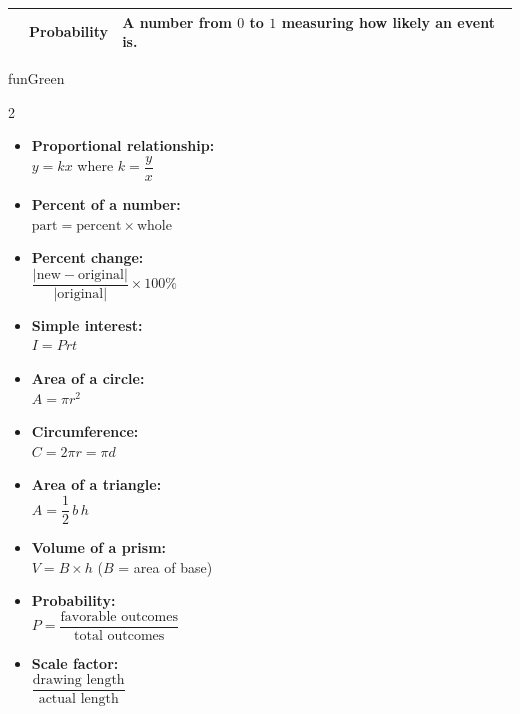 {\begin{center}
\begin{tabular}{
    >{\centering\arraybackslash}m{2cm}
    >{\raggedright\arraybackslash}m{3cm}
    >{\raggedright\arraybackslash}m{8.5cm}
}
{\fontsize{18}{20}\selectfont\textcolor{funPink}{$P(\text{event})$}} &
Probability &
A number from $0$ to $1$ measuring how likely an event is. \\

\bottomrule
\end{tabular}
\end{center}

\vspace{3mm}

\begin{wbDashBox}{funGreen}
    {\color{funGreen}\faCalculator}\;
    \par\vspace{3pt}
    \small
    \begin{multicols}{2}
    \begin{itemize}[leftmargin=*, itemsep=3pt]
        \item \textbf{Proportional relationship:}\\
            $y = kx$ \quad where $k = \dfrac{y}{x}$
        \item \textbf{Percent of a number:}\\
            $\text{part} = \text{percent} \times \text{whole}$
        \item \textbf{Percent change:}\\
            $\dfrac{|\text{new} - \text{original}|}{|\text{original}|} \times 100\%$
        \item \textbf{Simple interest:}\\
            $I = Prt$
        \item \textbf{Area of a circle:}\\
            $A = \pi r^{2}$
        \item \textbf{Circumference:}\\
            $C = 2\pi r = \pi d$
        \item \textbf{Area of a triangle:}\\
            $A = \dfrac{1}{2}\,b\,h$
        \item \textbf{Volume of a prism:}\\
            $V = B \times h$ \; ($B$ = area of base)
        \item \textbf{Probability:}\\
            $P = \dfrac{\text{favorable outcomes}}{\text{total outcomes}}$
        \item \textbf{Scale factor:}\\
            $\dfrac{\text{drawing length}}{\text{actual length}}$
    \end{itemize}
    \end{multicols}
\end{wbDashBox}

}
